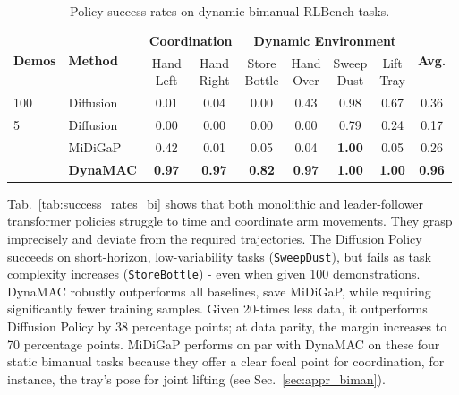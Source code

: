 \documentclass[letterpaper, 10 pt, journal, twoside]{IEEEtran}
\renewcommand{\secref}[1]{Sec.~\ref{#1}}
\newcommand{\tabref}[1]{Tab.~\ref{#1}}
\newcommand{\ourmethod}{DynaMAC\xspace}
\begin{document}
\begin{table}
        \caption{Policy success rates on dynamic bimanual RLBench tasks. }\label{tab:success_rates_bi_dyn}
        \centering
        \setlength{\tabcolsep}{2.75pt}
        \begin{threeparttable}
        \begin{tabular}{ll cc cccc c}
            \toprule
            \multirow{2}{*}{\textbf{Demos}} & \multirow{2}{*}{\textbf{Method}} & \multicolumn{2}{c}{\textbf{Coordination}} & \multicolumn{4}{c}{\textbf{Dynamic Environment}} & \multirow{2}{*}{\textbf{Avg.}}\\
            \cmidrule(lr){3-4}\cmidrule(lr){5-8}
            & & \makecell{Hand \\ Left} & \makecell{Hand \\ Right} &  \makecell{Store \\ Bottle} & \makecell{Hand \\ Over} & \makecell{Sweep \\ Dust} & \makecell{Lift \\ Tray} & \\
            \midrule
            100 & Diffusion~\cite{chi2023diffusionpolicy} & 0.01 & 0.04 & 0.00 & 0.43 & 0.98 & 0.67 & 0.36 \\
            \cmidrule{1-9}
                5 & Diffusion~\cite{chi2023diffusionpolicy} &  0.00 & 0.00 & 0.00 & 0.00 & 0.79 & 0.24 & 0.17 \\
            & MiDiGaP\cite{von2025unreasonable} &  0.42 & 0.01 & 0.05 & 0.04 & \textbf{1.00} & 0.05 & 0.26 \\
            & \textbf{\ourmethod{}} & \textbf{0.97} & \textbf{0.97} & \textbf{0.82} & \textbf{0.97} &  \textbf{1.00} & \textbf{1.00} & \textbf{0.96} \\
            \bottomrule
        \end{tabular}
        \end{threeparttable}
        \vspace{-0.3cm}
\end{table} %

\tabref{tab:success_rates_bi} shows that both monolithic and leader-follower transformer policies struggle to time and coordinate arm movements.
%
%
%
They grasp imprecisely and deviate from the required trajectories.
%
The Diffusion Policy succeeds on short-horizon, low-variability tasks (\texttt{SweepDust}), but fails as task complexity increases (\texttt{StoreBottle}) - even when given 100 demonstrations.
%
%
%
\ourmethod{} robustly outperforms all baselines, save MiDiGaP, while requiring significantly fewer training samples.
Given 20-times less data, it outperforms Diffusion Policy by 38 percentage points; at data parity, the margin increases to 70 percentage points.
MiDiGaP performs on par with \ourmethod{} on these four static bimanual tasks because they offer a clear focal point for coordination, for instance, the tray's pose for joint lifting (see \secref{sec:appr_biman}).
%
\end{document}
